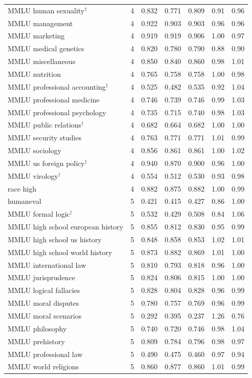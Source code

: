 \begin{longtable}{lrrrrrr}
MMLU human sexuality$^\dagger$ & 4 & 0.832 & 0.771 & 0.809 & 0.91 & 0.96 \\
MMLU management & 4 & 0.922 & 0.903 & 0.903 & 0.96 & 0.96 \\
MMLU marketing & 4 & 0.919 & 0.919 & 0.906 & 1.00 & 0.97 \\
MMLU medical genetics & 4 & 0.820 & 0.780 & 0.790 & 0.88 & 0.90 \\
MMLU miscellaneous & 4 & 0.850 & 0.840 & 0.860 & 0.98 & 1.01 \\
MMLU nutrition & 4 & 0.765 & 0.758 & 0.758 & 1.00 & 0.98 \\
MMLU professional accounting$^\dagger$ & 4 & 0.525 & 0.482 & 0.535 & 0.92 & 1.04 \\
MMLU professional medicine & 4 & 0.746 & 0.739 & 0.746 & 0.99 & 1.03 \\
MMLU professional psychology & 4 & 0.735 & 0.715 & 0.740 & 0.98 & 1.03 \\
MMLU public relations$^\dagger$ & 4 & 0.682 & 0.664 & 0.682 & 1.00 & 1.00 \\
MMLU security studies & 4 & 0.763 & 0.771 & 0.771 & 1.01 & 0.99 \\
MMLU sociology & 4 & 0.856 & 0.861 & 0.861 & 1.00 & 1.02 \\
MMLU us foreign policy$^\dagger$ & 4 & 0.940 & 0.870 & 0.900 & 0.96 & 1.00 \\
MMLU virology$^\dagger$ & 4 & 0.554 & 0.512 & 0.530 & 0.93 & 0.98 \\
race high & 4 & 0.882 & 0.875 & 0.882 & 1.00 & 0.99 \\
humaneval & 5 & 0.421 & 0.415 & 0.427 & 0.86 & 1.00 \\
MMLU formal logic$^\dagger$ & 5 & 0.532 & 0.429 & 0.508 & 0.84 & 1.06 \\
MMLU high school european history & 5 & 0.855 & 0.812 & 0.830 & 0.95 & 0.99 \\
MMLU high school us history & 5 & 0.848 & 0.858 & 0.853 & 1.02 & 1.01 \\
MMLU high school world history & 5 & 0.873 & 0.882 & 0.869 & 1.01 & 1.00 \\
MMLU international law & 5 & 0.810 & 0.793 & 0.818 & 0.96 & 1.00 \\
MMLU jurisprudence & 5 & 0.824 & 0.806 & 0.815 & 1.00 & 1.00 \\
MMLU logical fallacies & 5 & 0.828 & 0.804 & 0.828 & 0.96 & 0.99 \\
MMLU moral disputes & 5 & 0.780 & 0.757 & 0.769 & 0.96 & 0.99 \\
MMLU moral scenarios & 5 & 0.292 & 0.395 & 0.237 & 1.26 & 0.76 \\
MMLU philosophy & 5 & 0.740 & 0.720 & 0.746 & 0.98 & 1.04 \\
MMLU prehistory & 5 & 0.809 & 0.784 & 0.796 & 0.98 & 0.97 \\
MMLU professional law & 5 & 0.490 & 0.475 & 0.460 & 0.97 & 0.94 \\
MMLU world religions & 5 & 0.860 & 0.877 & 0.860 & 1.01 & 0.99 \\
\end{longtable}
